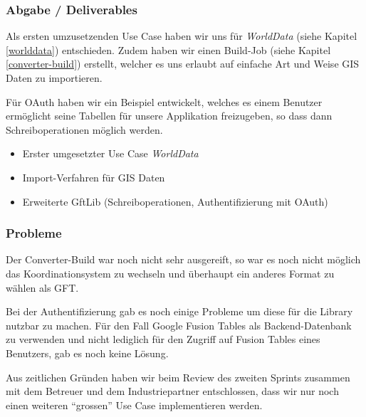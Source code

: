 \subsubsection{Abgabe / Deliverables}
Als ersten umzusetzenden Use Case haben wir uns für \emph{WorldData} (siehe Kapitel \ref{worlddata}) entschieden. Zudem haben wir einen Build-Job (siehe Kapitel \ref{converter-build}) erstellt, welcher es uns erlaubt auf einfache Art und Weise \gls{GIS} Daten zu importieren.

Für OAuth haben wir ein Beispiel entwickelt, welches es einem Benutzer ermöglicht seine Tabellen für unsere Applikation freizugeben, so dass dann Schreiboperationen möglich werden.

\begin{itemize}
	\item Erster umgesetzter Use Case \emph{WorldData}
	\item Import-Verfahren für \gls{GIS} Daten
	\item Erweiterte GftLib (Schreiboperationen, Authentifizierung mit OAuth)
\end{itemize}

\subsubsection{Probleme}
Der Converter-Build war noch nicht sehr ausgereift, so war es noch nicht möglich das Koordinationsystem zu wechseln und überhaupt ein anderes Format zu wählen als GFT.

Bei der Authentifizierung gab es noch einige Probleme um diese für die Library nutzbar zu machen. Für den Fall Google Fusion Tables als Backend-Datenbank zu verwenden und nicht lediglich für den Zugriff auf Fusion Tables eines Benutzers, gab es noch keine Lösung.

Aus zeitlichen Gründen haben wir beim Review des zweiten Sprints zusammen mit dem Betreuer und dem Industriepartner entschlossen, dass wir nur noch einen weiteren "`grossen"' Use Case implementieren werden.